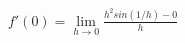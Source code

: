 \documentclass[preview]{standalone}
\begin{document}
\begin{align*}
f'(0) = \lim_{h\to 0} \frac{h^{2}sin(1/h)-0}{h}
\end{align*}
\end{document}
